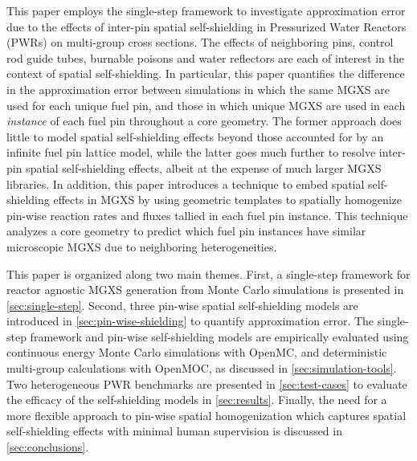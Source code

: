 This paper employs the single-step framework to investigate approximation error due to the effects of inter-pin spatial self-shielding in Pressurized Water Reactors (PWRs) on multi-group cross sections. The effects of neighboring pins, control rod guide tubes, burnable poisons and water reflectors are each of interest in the context of spatial self-shielding. In particular, this paper quantifies the difference in the approximation error between simulations in which the same MGXS are used for each unique fuel pin, and those in which unique MGXS are used in each \textit{instance} of each fuel pin throughout a core geometry. The former approach does little to model spatial self-shielding effects beyond those accounted for by an infinite fuel pin lattice model, while the latter goes much further to resolve inter-pin spatial self-shielding effects, albeit at the expense of much larger MGXS libraries. In addition, this paper introduces a technique to embed spatial self-shielding effects in MGXS by using geometric templates to spatially homogenize pin-wise reaction rates and fluxes tallied in each fuel pin instance. This technique analyzes a core geometry to predict which fuel pin instances have similar microscopic MGXS due to neighboring heterogeneities.

This paper is organized along two main themes. First, a single-step framework for reactor agnostic MGXS generation from Monte Carlo simulations is presented in \autoref{sec:single-step}. Second, three pin-wise spatial self-shielding models are introduced in \autoref{sec:pin-wise-shielding} to quantify approximation error. The single-step framework and pin-wise self-shielding models are empirically evaluated using continuous energy Monte Carlo simulations with OpenMC, and deterministic multi-group calculations with OpenMOC, as discussed in \autoref{sec:simulation-tools}. Two heterogeneous PWR benchmarks are presented in \autoref{sec:test-cases} to evaluate the efficacy of the self-shielding models in \autoref{sec:results}. Finally, the need for a more flexible approach to pin-wise spatial homogenization which captures spatial self-shielding effects with minimal human supervision is discussed in \autoref{sec:conclusions}.

